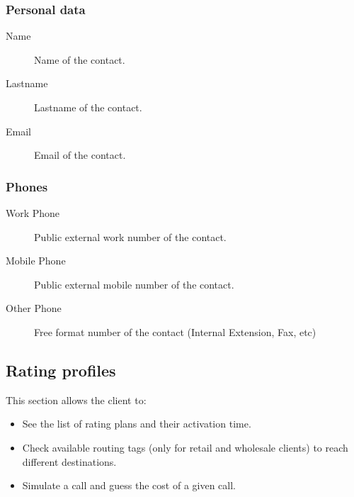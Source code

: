 \documentclass[letterpaper,10pt,spanish]{sphinxmanual}
\begin{document}
\subsubsection{Personal data}
\label{administration_portal/client/vpbx/addressbook:personal-data}\begin{description}
\item[{Name}] \leavevmode{}\label{administration_portal/client/vpbx/addressbook:term-name}
Name of the contact.

\item[{Lastname}] \leavevmode{}\label{administration_portal/client/vpbx/addressbook:term-lastname}
Lastname of the contact.

\item[{Email}] \leavevmode{}\label{administration_portal/client/vpbx/addressbook:term-email}
Email of the contact.

\end{description}


\subsubsection{Phones}
\label{administration_portal/client/vpbx/addressbook:phones}\begin{description}
\item[{Work Phone}] \leavevmode{}\label{administration_portal/client/vpbx/addressbook:term-work-phone}
Public external work number of the contact.

\item[{Mobile Phone}] \leavevmode{}\label{administration_portal/client/vpbx/addressbook:term-mobile-phone}
Public external mobile number of the contact.

\item[{Other Phone}] \leavevmode{}\label{administration_portal/client/vpbx/addressbook:term-other-phone}
Free format number of the contact (Internal Extension, Fax, etc)

\end{description}


\subsection{Rating profiles}
\label{administration_portal/client/vpbx/rating_profiles:rating-profiles}\label{administration_portal/client/vpbx/rating_profiles::doc}
This section allows the client to:
\begin{itemize}
\item {} 
See the list of rating plans and their activation time.

\item {} 
Check available routing tags (only for retail and wholesale clients) to reach different destinations.

\item {} 
Simulate a call and guess the cost of a given call.

\end{itemize}
\end{document}
